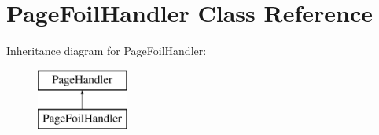 \hypertarget{classPageFoilHandler}{\section{Page\-Foil\-Handler Class Reference}
\label{classPageFoilHandler}
}
Inheritance diagram for Page\-Foil\-Handler\-:\begin{figure}[H]
\begin{center}
\leavevmode
\includegraphics[height=2.000000cm]{classPageFoilHandler}
\end{center}
\end{figure}
